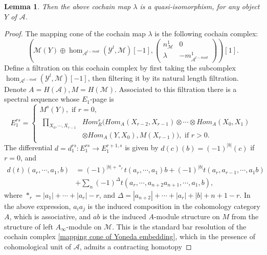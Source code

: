 \documentclass{amsart}
\newtheorem{lemma}[theorem]{Lemma}
\numberwithin{equation}{section}
\numberwithin{figure}{section}
\begin{document}
\begin{lemma}
	Then the above cochain map $\lambda$ is a quasi-isomorphism, for any object $Y$ of $\mathcal{A}$.
\end{lemma}
\begin{proof}
	The mapping cone of the cochain map $\lambda$ is the following cochain complex:
\begin{equation} \label{mapping cone of Yoneda embedding}
(\mathcal{M}(Y) \oplus \hom_{\mathcal{A}^{l-mod}}(\mathcal{Y}^{l}, \mathcal{M})[-1], \begin{pmatrix}
n^{1}_{\mathcal{M}} & 0\\
\lambda & -m^{1}_{\mathcal{A}^{l-mod}}
\end{pmatrix}
)[1].
\end{equation}
Define a filtration on this cochain complex by first taking the subcomplex $\hom_{\mathcal{A}^{l-mod}}(\mathcal{Y}^{l}, \mathcal{M})[-1]$, then filtering it by its natural length filtration. Denote $A = H(\mathcal{A}), M = H(\mathcal{M})$. Associated to this filtration there is a spectral sequence whose $E_{1}$-page is
\begin{equation}
E_{1}^{rs} =
\begin{cases}
M^{s}(Y), \text{ if } r=0,\\
\begin{split}
\prod_{X_{0}, \cdots, X_{r-1}} & Hom^{s}_{R}(Hom_{A}(X_{r-2}, X_{r-1}) \otimes \cdots \otimes Hom_{A}(X_{0}, X_{1})\\
&\otimes Hom_{A}(Y, X_{0}), M(X_{r-1})), \text{ if } r>0.
\end{split}
\end{cases}
\end{equation}
The differential $d = d_{1}^{rs}: E_{1}^{rs} \to E_{1}^{r+1, s}$ is given by $d(c)(b) = (-1)^{|b|}(c)$ if $r=0$, and
\begin{equation}
\begin{split}
d(t)(a_{r}, \cdots, a_{1}, b) &= (-1)^{|b|+ *_{r}}t(a_{r}, \cdots, a_{1})b + (-1)^{|b|}t(a_{r}, a_{r-1}, \cdots, a_{1}b)\\
&+ \sum_{n} (-1)^{\Delta}t(a_{r}, \cdots, a_{n+2}a_{n+1}, \cdots, a_{1}, b),
\end{split}
\end{equation}
where $*_{r} = |a_{1}| + \cdots + |a_{r}| - r$, and $\Delta = |a_{n+2}| + \cdots + |a_{r}| + |b| + n + 1 - r$. In the above expression, $a_{i}a_{j}$ is the induced composition in the cohomology category $A$, which is associative, and $ab$ is the induced $A$-module structure on $M$ from the structure of left $A_{\infty}$-module on $\mathcal{M}$. This is the standard bar resolution of the cochain complex \eqref{mapping cone of Yoneda embedding}, which in the presence of cohomological unit of $\mathcal{A}$, admits a contracting homotopy

\end{proof}
\end{document}
